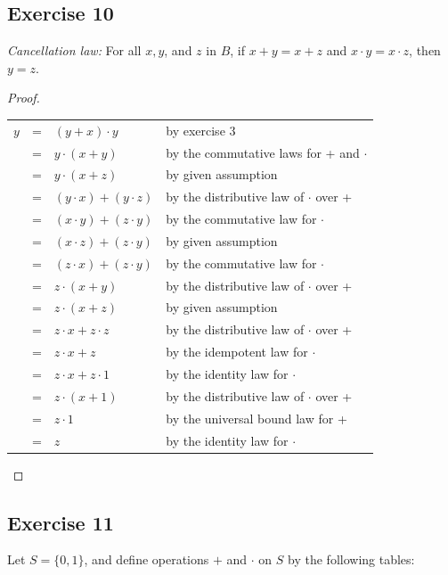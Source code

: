 \documentclass[14pt]{extarticle}
\newcommand{\cy}{\color{cyan}}
\begin{document}
\subsection{Exercise 10}
{\it Cancellation law:} For all $x, y$, and $z$ in $B$, if \(x + y = x + z\) and \(x \cdot y = x \cdot z\), then \(y = z\).

\begin{proof}
\begin{center}
\begin{tabular}{rcll}
$y$ & = & \((y + x) \cdot y\) & {\cy by exercise 3} \\
& = & \(y \cdot (x + y)\) & {\cy by the commutative laws for + and $\cdot$} \\
& = & \(y \cdot (x + z)\) & {\cy by given assumption} \\
& = & \((y \cdot x) + (y \cdot z)\) & {\cy by the distributive law of $\cdot$ over +} \\
& = & \((x \cdot y) + (z \cdot y)\) & {\cy by the commutative law for $\cdot$} \\
& = & \((x \cdot z) + (z \cdot y)\) & {\cy by given assumption} \\
& = & \((z \cdot x) + (z \cdot y)\) & {\cy by the commutative law for $\cdot$} \\
& = & \(z \cdot (x + y)\) & {\cy by the distributive law of $\cdot$ over +} \\
& = & \(z \cdot (x + z)\) & {\cy by given assumption} \\
& = & \(z \cdot x + z \cdot z\) & {\cy by the distributive law of $\cdot$ over +} \\
& = & \(z \cdot x + z\) & {\cy by the idempotent law for $\cdot$} \\
& = & \(z \cdot x + z \cdot 1\) & {\cy by the identity law for $\cdot$} \\
& = & \(z \cdot (x + 1)\) & {\cy by the distributive law of $\cdot$ over +} \\
& = & \(z \cdot 1\) & {\cy by the universal bound law for +} \\
& = & \(z\) & {\cy by the identity law for $\cdot$}
\end{tabular}
\end{center}
\end{proof}

\subsection{Exercise 11}
Let \(S = \{0, 1\}\), and define operations $+$ and $\cdot$ on $S$ by the following tables:
\end{document}
